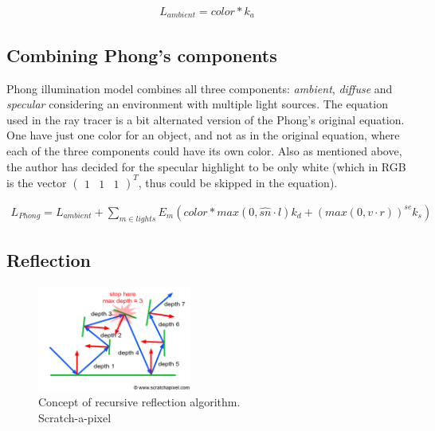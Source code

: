 \documentclass{article}
\begin{document}
\begin{align}
L_{ambient} = color * k_{a}
\label{eq:ambient}
\end{align}

\subsection*{Combining Phong's components}
Phong illumination model combines all three components: \textit{ambient}, \textit{diffuse} and \textit{specular} considering an environment with multiple light sources. The equation used in the ray tracer is a bit alternated version of the Phong's original equation. One have just one color for an object, and not as in the original equation, where each of the three components could have its own color. Also as mentioned above, the author has decided for the specular highlight to be only white (which in RGB is the vector $\begin{pmatrix}1&1&1\end{pmatrix}^{T}$, thus could be skipped in the equation).

\begin{align}
L_{Phong} = L_{ambient} + \sum_{m \in lights} E_{m}(color * max(0, \hat{sn} \cdot l)k_{d} + (max(0, v \cdot r))^{se}k_{s})
\end{align}


\subsection{Reflection}
\begin{figure}
	\centering
	\includegraphics[width=0.45\textwidth]{recursive_reflection_rays}
	\caption{Concept of recursive reflection algorithm. \\ Scratch-a-pixel}
	\label{fig:recursive_reflection_rays}
\end{figure}
\end{document}

